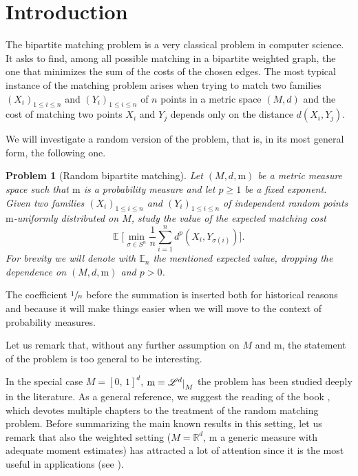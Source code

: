 \documentclass[JEP,XML,SOM,Unicode]{cedram}
\newcounter{results}[section]
\theoremstyle{plain}
\newtheorem*{problem*}{Problem}
\theoremstyle{definition}
\numberwithin{equation}{section}
\newcommand{\RR}{\ensuremath{\mathbb R}}
\newcommand{\bbE}[1]{\ensuremath{\operatorname{\mathbb{E}}\biggl[#1\biggr]}}
\newcommand{\Leb}{\ensuremath{\mathscr L}}
\newcommand{\cc}[2]{\ensuremath{\left[#1,\,#2\right]}}
\newcommand{\fullstop}{\ensuremath{\text{. }}}
\newcommand{\m}{\ensuremath{\mathrm m}}
\newcommand{\restricts}[2] {
	#1 %
	\raisebox{-.3ex}{$|$}_{#2}
}
\begin{document}
\maketitle
\vspace*{-\baselineskip}
\tableofcontents


\section{Introduction}
The bipartite matching problem is a very classical problem in computer science. It asks to find, among all
possible matching in a bipartite weighted graph, the one that minimizes the sum of the costs of the chosen
edges. The most typical instance of the matching problem arises when trying to match two families
$(X_i)_{1\le i\le n}$ and $(Y_i)_{1\le i\le n}$ of $n$ points in a metric space $(M, d)$ and the cost of
matching two points $X_i$ and $Y_j$ depends only on the distance $d(X_i, Y_j)$.

We will investigate a random version of the problem, that is, in its most general form, the following one.
\begin{problem*}[Random bipartite matching]
Let $(M, d, \m)$ be a metric measure space such that $\m$ is a probability measure and let $p\ge 1$ be
a fixed exponent.
Given two families $(X_i)_{1\le i\le n}$ and $(Y_i)_{1\le i\le n}$ of independent random points
$\m$-uniformly distributed on $M$, study the value of the expected matching cost
\begin{equation*}
\bbE{\min_{\sigma\in S^n} \frac1n\sum_{i=1}^n d^p\left(X_i, Y_{\sigma(i)}\right)} \fullstop
\end{equation*}
For brevity we will denote with $\mathbb E_n$ the mentioned expected value, dropping the dependence on
$(M, d, \m)$ and $p>0$.
\end{problem*}
The coefficient $\sfrac1n$ before the summation is inserted both for historical reasons and because it will
make things easier when we will move to the context of probability measures.

Let us remark that, without any further assumption on $M$ and $\m$, the statement of the problem is too general to be interesting.

In the special case $M=\cc01^d$, $\m=\restricts{\Leb^d}{M}$ the problem has been studied deeply in
the literature.
As a general reference, we suggest the reading of the book \cite{Talagrand14}, which devotes multiple chapters to
the treatment of the random matching problem.
Before summarizing the main known results in this setting, let us remark that also the weighted setting ($M=\RR^d$, $\m$ a generic measure with adequate moment estimates) has attracted a lot of attention since it is the most useful in applications (see \cite{DereichScheutzowSchottstedt2013,BoissarLeGouic2014,FournierGuillin2015,WeedBach2017}).
\end{document}
